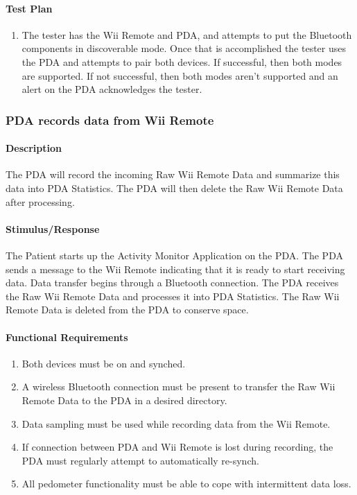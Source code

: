 \documentclass{article}
\begin{document}
\paragraph {Test Plan}
\begin{enumerate}
\item The tester has the Wii Remote and PDA, and attempts to put the Bluetooth components in discoverable mode. Once that is accomplished the tester uses the PDA and attempts to pair both devices. If successful, then both modes are supported. If not successful, then both modes aren't supported and an alert on the PDA acknowledges the tester.
\end{enumerate}

\subsubsection{PDA records data from Wii Remote}\label{sec: PDA Records Data}

\paragraph{Description}
The PDA will record the incoming Raw Wii Remote Data and summarize this data into PDA Statistics. The PDA will then delete the Raw Wii Remote Data after processing.

\paragraph{Stimulus/Response}
The Patient starts up the Activity Monitor Application on the PDA. The PDA sends a message to the Wii Remote indicating that it is ready to start receiving data. Data transfer begins through a Bluetooth connection. The PDA receives the Raw Wii Remote Data and processes it into PDA Statistics. The Raw Wii Remote Data is deleted from the PDA  to conserve space. 

\paragraph{Functional Requirements}
\begin{enumerate}
\item Both devices must be on and synched.
\item A wireless Bluetooth connection must be present to transfer the Raw Wii Remote Data to the PDA in a desired directory.
\item Data sampling must be used while recording data from the Wii Remote.
\item If connection between PDA and Wii Remote is lost during recording, the PDA must regularly attempt to automatically re-synch.
\item All pedometer functionality must be able to cope with intermittent data loss.
\end{enumerate}
\end{document}
